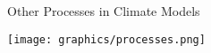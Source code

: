 \begin{slide}{Other Processes in Climate Models}

\texttt{[image: graphics/processes.png]}

\end{slide}

